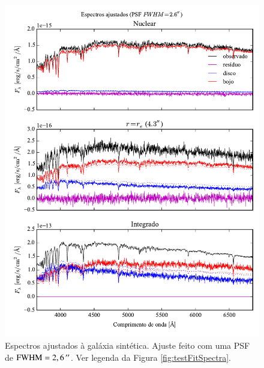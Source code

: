\begin{figure}
	\includegraphics{figuras/simulation_spectra_psf26}
	\caption[Espectros ajustados (teste com PSF $\mathrm{FWHM} = 2,6\,\arcs$).]
	{Espectros ajustados à galáxia sintética. Ajuste feito com uma PSF de
	$\mathrm{FWHM} = 2,6\,\arcs$. Ver legenda da Figura \ref{fig:testFitSpectra}.}
	\label{fig:testFitSpectra26}
\end{figure}

